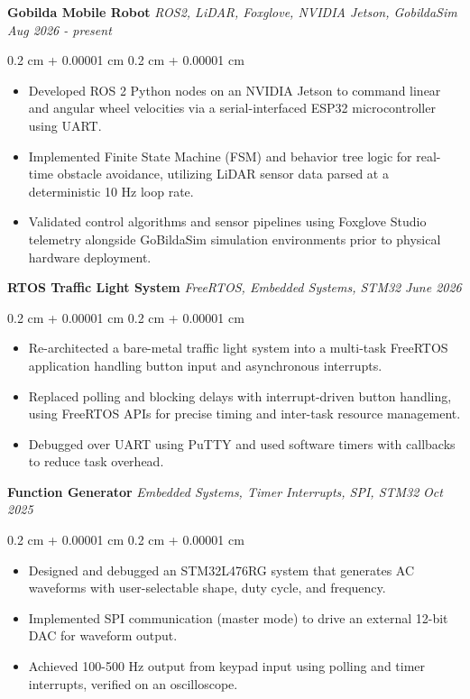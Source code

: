 \documentclass[10pt, letterpaper]{article}
\newenvironment{highlights}{
    \begin{itemize}[
        topsep=0.10 cm,
        parsep=0.10 cm,
        partopsep=0pt,
        itemsep=0pt,
        leftmargin=0.4 cm + 10pt
    ]
}{
    \end{itemize}
} %
\newenvironment{onecolentry}{
    \begin{adjustwidth}{
        0.2 cm + 0.00001 cm
    }{
        0.2 cm + 0.00001 cm
    }
}{
    \end{adjustwidth}
} %
\begin{document}
\textbf{Gobilda Mobile Robot} \textbar{} \textit{ROS2, LiDAR, Foxglove, NVIDIA Jetson, GobildaSim} \hfill \textit{Aug 2026 - present}\vspace{0.08 cm}
\begin{onecolentry}
\begin{highlights}
    \item Developed ROS 2 Python nodes on an NVIDIA Jetson to command linear and angular wheel velocities via a serial-interfaced ESP32 microcontroller using UART.
    \item Implemented Finite State Machine (FSM) and behavior tree logic for real-time obstacle avoidance, utilizing LiDAR sensor data parsed at a deterministic 10 Hz loop rate.
    \item Validated control algorithms and sensor pipelines using Foxglove Studio telemetry alongside GoBildaSim simulation environments prior to physical hardware deployment.
\end{highlights}
\end{onecolentry}
\vspace{0.14 cm}

\textbf{RTOS Traffic Light System} \textbar{} \textit{FreeRTOS, Embedded Systems, STM32} \hfill \textit{June 2026}\vspace{0.08 cm}
\begin{onecolentry}
\begin{highlights}
    \item Re-architected a bare-metal traffic light system into a multi-task FreeRTOS application handling button input and asynchronous interrupts.
    \item Replaced polling and blocking delays with interrupt-driven button handling, using FreeRTOS APIs for precise timing and inter-task resource management.
    \item Debugged over UART using PuTTY and used software timers with callbacks to reduce task overhead.
\end{highlights}
\end{onecolentry}
\vspace{0.14 cm}

\textbf{Function Generator} \textbar{} \textit{Embedded Systems, Timer Interrupts, SPI, STM32} \hfill \textit{Oct 2025}
\vspace{0.08 cm}
\begin{onecolentry}
\begin{highlights}
    \item Designed and debugged an STM32L476RG system that generates AC waveforms with user-selectable shape, duty cycle, and frequency.
    \item Implemented SPI communication (master mode) to drive an external 12-bit DAC for waveform output.
    \item Achieved 100-500 Hz output from keypad input using polling and timer interrupts, verified on an oscilloscope.
\end{highlights}
\end{onecolentry}
\vspace{0.14 cm}
\end{document}
